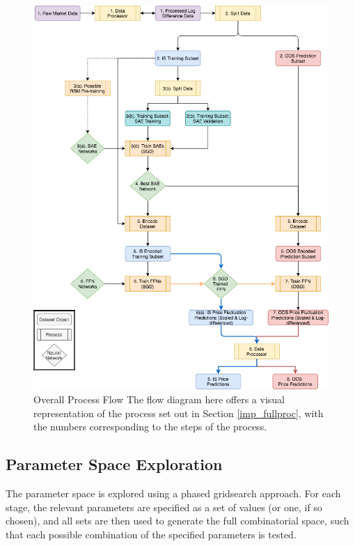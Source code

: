 \documentclass[a4paper,11pt,oneside]{article}
\theoremstyle{plain}
\theoremstyle{definition}
\begin{document}
	\begin{figure}[H]
		\centering \includegraphics[scale=0.6]{images/process_implementation/process_flow.png}
		\caption[Overall Process Flow Diagram]{Overall Process Flow
		\newline The flow diagram here offers a visual representation of the process set out in Section \ref{imp_fullproc}, with the numbers corresponding to the steps of the process.}
		\label{figure-proc_diagram}
	\end{figure}
	
	\subsection{Parameter Space Exploration}\label{proc_parameters}
	
	The parameter space is explored using a phased gridsearch approach. For each stage, the relevant parameters are specified as a set of values (or one, if so chosen), and all sets are then used to generate the full combinatorial space, such that each possible combination of the specified parameters is tested.
	
\end{document}
